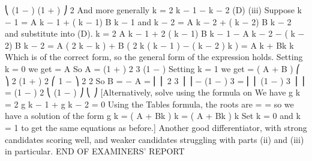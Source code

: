 \documentclass[a4paper,12pt]{article}
\begin{document}
⎝ (1 − \alpha ) (1 + \alpha ) ⎠
2 \alpha{}%
And more generally \gamma k = 2 \alpha\gamma k − 1 −  \gamma k − 2 (D)
(iii)
Suppose \gamma k − 1 = A \alpha k − 1 + ( k − 1) B \alpha k − 1 and \gamma k − 2 = A \alpha k − 2 + ( k − 2) B \alpha k − 2 and
substitute into (D).
\gamma k = 2 \alpha A \alpha k − 1 + 2 \alpha ( k − 1) B \alpha k − 1 −  A \alpha k − 2 − ( k − 2)  B \alpha k − 2
= A ( 2 \alpha k − \alpha k ) + B ( 2 \alpha k ( k − 1 ) − ( k − 2 ) \alpha k ) = A \alpha k + Bk \alpha k
Which is of the correct form, so the general form of the expression holds.
Setting k = 0 we get  = A
So A =
(1 +  )
2 3
(1 − \alpha )
Setting k = 1 we get  = ( A + B ) \alpha
⎛
⎞ 2 (1 +  ) 2 ⎛ 1 −  ⎞ 2
2 \alpha
So B = − A = ⎜ ⎜
2 3 ⎟
⎟ \sigma − (1 −  ) 3 \sigma = ⎜ ⎜ (1 −  ) 3 ⎟ ⎟ \sigma = (1 −  ) 2
\alpha
⎝ \alpha (1 − \alpha ) ⎠
⎝
⎠
[Alternatively, solve using the formula on %
We have g k = 2 \alpha g k − 1 +  g k − 2 = 0
Using the Tables formula, the roots are  =  = \alpha so we have a solution
of the form g k = ( A + Bk ) \lambda k = ( A + Bk ) \alpha k
Set k = 0 and k = 1 to get the same equations as before.]
Another good differentiator, with strong candidates scoring well, and weaker candidates
struggling with parts (ii) and (iii) in particular.
END OF EXAMINERS’ REPORT
\end{document}
